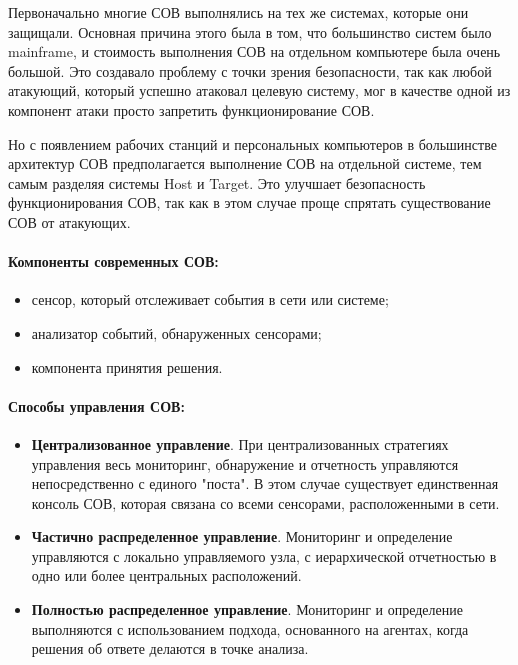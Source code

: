 Первоначально многие СОВ выполнялись на тех же системах, которые они защищали. 
Основная причина этого была в том, что большинство систем было mainframe, и стоимость 
выполнения СОВ на отдельном компьютере была очень большой. Это создавало проблему с 
точки зрения безопасности, так как любой атакующий, который успешно атаковал целевую 
систему, мог в качестве одной из компонент атаки просто запретить функционирование СОВ.

Но с появлением рабочих станций и персональных компьютеров в большинстве архитектур 
СОВ предполагается выполнение СОВ на отдельной системе, тем самым разделяя системы 
Host и Target. Это улучшает безопасность функционирования СОВ, так как в этом случае 
проще спрятать существование СОВ от атакующих.


\paragraph*{Компоненты современных СОВ:}

\begin{itemize}
	\item сенсор, который отслеживает события в сети или системе;
	
	\item анализатор событий, обнаруженных сенсорами;
	
	\item компонента принятия решения.
\end{itemize}


\paragraph*{Способы управления СОВ:}

\begin{itemize}
	\item \textbf{Централизованное управление}. При централизованных стратегиях управления 
	весь мониторинг, обнаружение и отчетность управляются непосредственно с единого "поста". 
	В этом случае существует единственная консоль СОВ, которая связана со всеми сенсорами, 
	расположенными в сети.

	\item \textbf{Частично распределенное управление}. Мониторинг и определение управляются 
	с локально управляемого узла, с иерархической отчетностью в одно или более центральных 
	расположений.

	\item \textbf{Полностью распределенное управление}. Мониторинг и определение выполняются 
	с использованием подхода, основанного на агентах, когда решения об ответе делаются в 
	точке анализа.
\end{itemize}

